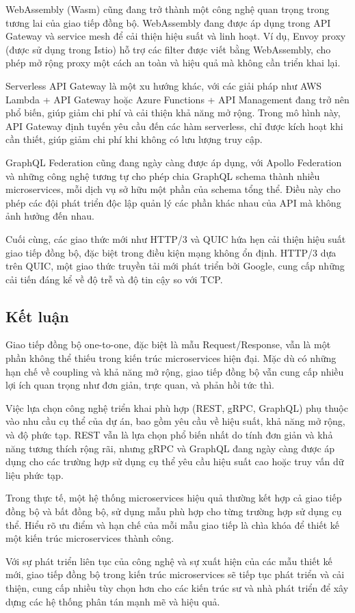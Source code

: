 WebAssembly (Wasm) cũng đang trở thành một công nghệ quan trọng trong tương lai của giao tiếp đồng bộ. WebAssembly đang được áp dụng trong API Gateway và service mesh để cải thiện hiệu suất và linh hoạt. Ví dụ, Envoy proxy (được sử dụng trong Istio) hỗ trợ các filter được viết bằng WebAssembly, cho phép mở rộng proxy một cách an toàn và hiệu quả mà không cần triển khai lại.

Serverless API Gateway là một xu hướng khác, với các giải pháp như AWS Lambda + API Gateway hoặc Azure Functions + API Management đang trở nên phổ biến, giúp giảm chi phí và cải thiện khả năng mở rộng. Trong mô hình này, API Gateway định tuyến yêu cầu đến các hàm serverless, chỉ được kích hoạt khi cần thiết, giúp giảm chi phí khi không có lưu lượng truy cập.

GraphQL Federation cũng đang ngày càng được áp dụng, với Apollo Federation và những công nghệ tương tự cho phép chia GraphQL schema thành nhiều microservices, mỗi dịch vụ sở hữu một phần của schema tổng thể. Điều này cho phép các đội phát triển độc lập quản lý các phần khác nhau của API mà không ảnh hưởng đến nhau.

Cuối cùng, các giao thức mới như HTTP/3 và QUIC hứa hẹn cải thiện hiệu suất giao tiếp đồng bộ, đặc biệt trong điều kiện mạng không ổn định. HTTP/3 dựa trên QUIC, một giao thức truyền tải mới phát triển bởi Google, cung cấp những cải tiến đáng kể về độ trễ và độ tin cậy so với TCP.

\subsection{Kết luận}
Giao tiếp đồng bộ one-to-one, đặc biệt là mẫu Request/Response, vẫn là một phần không thể thiếu trong kiến trúc microservices hiện đại. Mặc dù có những hạn chế về coupling và khả năng mở rộng, giao tiếp đồng bộ vẫn cung cấp nhiều lợi ích quan trọng như đơn giản, trực quan, và phản hồi tức thì.

Việc lựa chọn công nghệ triển khai phù hợp (REST, gRPC, GraphQL) phụ thuộc vào nhu cầu cụ thể của dự án, bao gồm yêu cầu về hiệu suất, khả năng mở rộng, và độ phức tạp. REST vẫn là lựa chọn phổ biến nhất do tính đơn giản và khả năng tương thích rộng rãi, nhưng gRPC và GraphQL đang ngày càng được áp dụng cho các trường hợp sử dụng cụ thể yêu cầu hiệu suất cao hoặc truy vấn dữ liệu phức tạp.

Trong thực tế, một hệ thống microservices hiệu quả thường kết hợp cả giao tiếp đồng bộ và bất đồng bộ, sử dụng mẫu phù hợp cho từng trường hợp sử dụng cụ thể. Hiểu rõ ưu điểm và hạn chế của mỗi mẫu giao tiếp là chìa khóa để thiết kế một kiến trúc microservices thành công.

Với sự phát triển liên tục của công nghệ và sự xuất hiện của các mẫu thiết kế mới, giao tiếp đồng bộ trong kiến trúc microservices sẽ tiếp tục phát triển và cải thiện, cung cấp nhiều tùy chọn hơn cho các kiến trúc sư và nhà phát triển để xây dựng các hệ thống phân tán mạnh mẽ và hiệu quả.